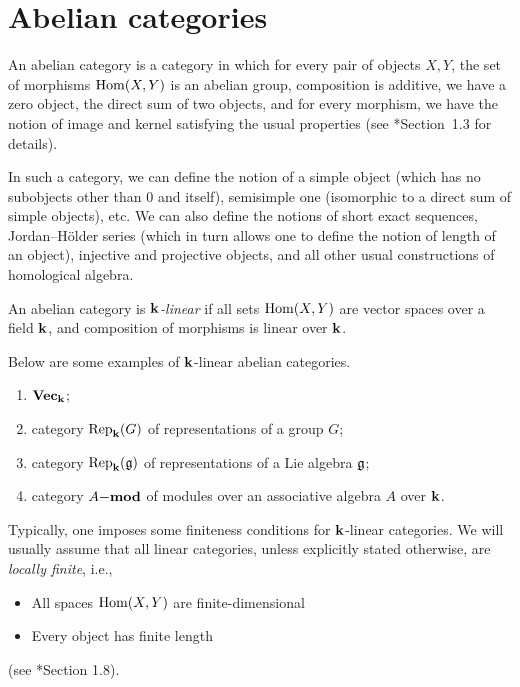 \section{Abelian categories}
\begin{definition}\label{d:abelian}
  An abelian category is a category in which for every pair of objects $X,Y$,
  the set of morphisms $\Hom(X,Y)$ is an abelian group, composition is
  additive, we have a zero object, the direct sum of two objects, and for every
  morphism, we have the notion of image and kernel satisfying the usual
  properties (see *{Section~1.3} for details).
\end{definition}
In such a category, we can define the notion of a simple object (which has no
subobjects other than $0$ and itself), semisimple one (isomorphic to a direct
sum of simple objects), etc. We can also define the notions of short exact
sequences, Jordan--H\"older series (which in turn allows one to define the
notion of length of an object), injective and projective objects, and all
other usual constructions of homological algebra.

An abelian category is
\emph{$\kk$-linear} if all sets
$\Hom(X,Y)$ are vector spaces over a field $\kk$, and composition of morphisms
is linear over $\kk$.

\begin{example}
  Below are some examples of $\kk$-linear abelian categories.
  \begin{enumerate}
    \item $\vect_\kk$;
    \item category $\Rep_\kk(G)$ of representations of a group $G$;
    \item category $\Rep_\kk(\g)$ of representations of a Lie algebra $\g$;
    \item category $A\mod$ of modules over an associative algebra $A$
      over $\kk$.
  \end{enumerate}
\end{example}

Typically, one imposes some finiteness conditions for $\kk$-linear
categories. We will usually assume that all linear categories, unless
explicitly stated otherwise, are
\emph{locally finite}, i.e.,
\begin{itemize}
  \item All spaces $\Hom(X,Y)$ are finite-dimensional
  \item Every object has finite length
\end{itemize}
(see *{Section 1.8}).

